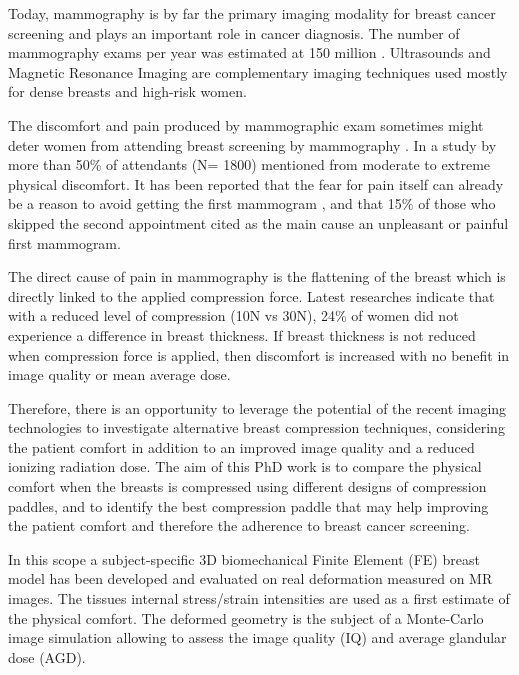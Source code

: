 Today, mammography is by far the primary imaging modality for breast cancer screening and plays an important role in cancer diagnosis. The number of mammography exams per year was estimated at 150 million . Ultrasounds and Magnetic Resonance Imaging are complementary imaging techniques used mostly for dense breasts and high-risk women.

The discomfort and pain produced by mammographic exam sometimes might deter women from attending breast screening by mammography \citep{aro_psychosocial_1999,fleming_intermittent_2013}. In a study by \citep{dullum_rates_2000} more than 50\% of attendants (N= 1800) mentioned from moderate to extreme physical discomfort.  It has been reported that the
fear for pain itself can already be a reason to avoid getting the first mammogram \citep{andrews_pain_2001}, and that 15\% of those who skipped the second appointment cited as the main cause an unpleasant or painful first mammogram\citep{fleming_intermittent_2013,whelehan_effect_2013}.

The direct cause of pain in mammography is the flattening of the breast which is directly linked to the applied compression force. Latest researches indicate that with a reduced level of compression (10N vs 30N), 24\% of women did not experience a difference in breast thickness. If breast thickness is not reduced when compression force is applied, then discomfort is increased with no benefit in image quality or mean average dose.

Therefore, there is an opportunity to leverage the potential of the recent imaging technologies to investigate alternative breast compression techniques, considering the patient comfort in addition to an improved image quality and a reduced ionizing radiation dose. The aim of this PhD work is to compare the physical comfort when the breasts is compressed using different designs of compression paddles, and to identify the best compression paddle that may help improving the patient comfort and therefore the adherence to breast cancer screening. 

In this scope a subject-specific 3D biomechanical Finite Element (FE) breast model has been developed and evaluated on real deformation measured on MR images. The tissues internal stress/strain intensities are used as a first estimate of the physical comfort. The deformed geometry is the subject of a Monte-Carlo image simulation allowing to assess the image quality (IQ) and average glandular dose (AGD).



